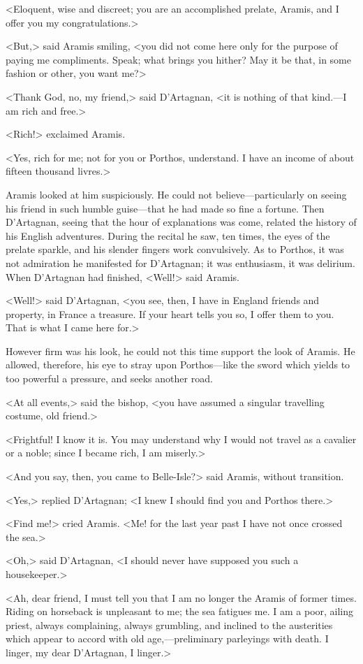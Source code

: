 <Eloquent, wise and discreet; you are an accomplished prelate, Aramis, and I offer you my congratulations.>

<But,> said Aramis smiling, <you did not come here only for the purpose of paying me compliments. Speak; what brings you hither? May it be that, in some fashion or other, you want me?>

<Thank God, no, my friend,> said D'Artagnan, <it is nothing of that kind.—I am rich and free.>

<Rich!> exclaimed Aramis.

<Yes, rich for me; not for you or Porthos, understand. I have an income of about fifteen thousand livres.>

Aramis looked at him suspiciously. He could not believe—particularly on seeing his friend in such humble guise—that he had made so fine a fortune. Then D'Artagnan, seeing that the hour of explanations was come, related the history of his English adventures. During the recital he saw, ten times, the eyes of the prelate sparkle, and his slender fingers work convulsively. As to Porthos, it was not admiration he manifested for D'Artagnan; it was enthusiasm, it was delirium. When D'Artagnan had finished, <Well!> said Aramis.

<Well!> said D'Artagnan, <you see, then, I have in England friends and property, in France a treasure. If your heart tells you so, I offer them to you. That is what I came here for.>

However firm was his look, he could not this time support the look of Aramis. He allowed, therefore, his eye to stray upon Porthos—like the sword which yields to too powerful a pressure, and seeks another road.

<At all events,> said the bishop, <you have assumed a singular travelling costume, old friend.>

<Frightful! I know it is. You may understand why I would not travel as a cavalier or a noble; since I became rich, I am miserly.>

<And you say, then, you came to Belle-Isle?> said Aramis, without transition.

<Yes,> replied D'Artagnan; <I knew I should find you and Porthos there.>

<Find me!> cried Aramis. <Me! for the last year past I have not once crossed the sea.>

<Oh,> said D'Artagnan, <I should never have supposed you such a housekeeper.>

<Ah, dear friend, I must tell you that I am no longer the Aramis of former times. Riding on horseback is unpleasant to me; the sea fatigues me. I am a poor, ailing priest, always complaining, always grumbling, and inclined to the austerities which appear to accord with old age,—preliminary parleyings with death. I linger, my dear D'Artagnan, I linger.>

